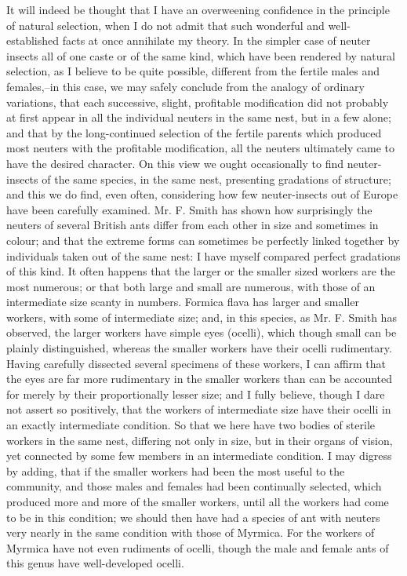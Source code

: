 It will indeed be thought that I have an overweening confidence in the principle of natural selection, when I do not admit that such wonderful and well-established facts at once annihilate my theory. In the simpler case of neuter insects all of one caste or of the same kind, which have been rendered by natural selection, as I believe to be quite possible, different from the fertile males and females,--in this case, we may safely conclude from the analogy of ordinary variations, that each successive, slight, profitable modification did not probably at first appear in all the individual neuters in the same nest, but in a few alone; and that by the long-continued selection of the fertile parents which produced most neuters with the profitable modification, all the neuters ultimately came to have the desired character. On this view we ought occasionally to find neuter-insects of the same species, in the same nest, presenting gradations of structure; and this we do find, even often, considering how few neuter-insects out of Europe have been carefully examined. Mr. F. Smith has shown how surprisingly the neuters of several British ants differ from each other in size and sometimes in colour; and that the extreme forms can sometimes be perfectly linked together by individuals taken out of the same nest: I have myself compared perfect gradations of this kind. It often happens that the larger or the smaller sized workers are the most numerous; or that both large and small are numerous, with those of an intermediate size scanty in numbers. Formica flava has larger and smaller workers, with some of intermediate size; and, in this species, as Mr. F. Smith has observed, the larger workers have simple eyes (ocelli), which though small can be plainly distinguished, whereas the smaller workers have their ocelli rudimentary. Having carefully dissected several specimens of these workers, I can affirm that the eyes are far more rudimentary in the smaller workers than can be accounted for merely by their proportionally lesser size; and I fully believe, though I dare not assert so positively, that the workers of intermediate size have their ocelli in an exactly intermediate condition. So that we here have two bodies of sterile workers in the same nest, differing not only in size, but in their organs of vision, yet connected by some few members in an intermediate condition. I may digress by adding, that if the smaller workers had been the most useful to the community, and those males and females had been continually selected, which produced more and more of the smaller workers, until all the workers had come to be in this condition; we should then have had a species of ant with neuters very nearly in the same condition with those of Myrmica. For the workers of Myrmica have not even rudiments of ocelli, though the male and female ants of this genus have well-developed ocelli.

